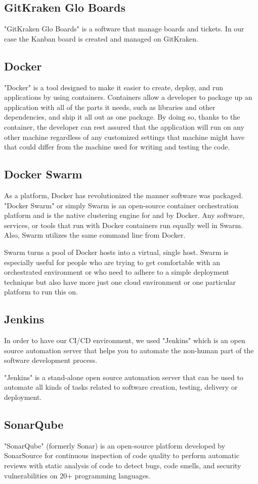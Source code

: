 \begin{spacing}{1.2}
\subsection{GitKraken Glo Boards}
"GitKraken Glo Boards" is a software that manage boards and tickets. In our case the Kanban board is created and managed on GitKraken.
\subsection{Docker}
"Docker" \cite{Docker} is a tool designed to make it easier to create, deploy, and run applications by using containers. Containers allow a developer to package up an application with all of the parts it needs, such as libraries and other dependencies, and ship it all out as one package. By doing so, thanks to the container, the developer can rest assured that the application will run on any other machine regardless of any customized settings that machine might have that could differ from the machine used for writing and testing the code.
\subsection{Docker Swarm}
As a platform, Docker has revolutionized the manner software was packaged. "Docker Swarm" \cite{Dockerswarm} or simply Swarm is an open-source container orchestration platform and is the native clustering engine for and by Docker. Any software, services, or tools that run with Docker containers run equally well in Swarm. Also, Swarm utilizes the same command line from Docker.

Swarm turns a pool of Docker hosts into a virtual, single host. Swarm is especially useful for people who are trying to get comfortable with an orchestrated environment or who need to adhere to a simple deployment technique but also have more just one cloud environment or one particular platform to run this on.
\subsection{Jenkins}
In order to have our CI/CD environment, we used "Jenkins" \cite{Jenkins} which is an open source automation server that helps you to automate the non-human part of the software development process.

"Jenkins" is a stand-alone open source automation server that can be used to automate all kinds of tasks related to software creation, testing, delivery or deployment.
\subsection{SonarQube}
"SonarQube" \cite{SonarQube} (formerly Sonar) is an open-source platform developed by SonarSource for continuous inspection of code quality to perform automatic reviews with static analysis of code to detect bugs, code smells, and security vulnerabilities on 20+ programming languages.


\end{spacing}
